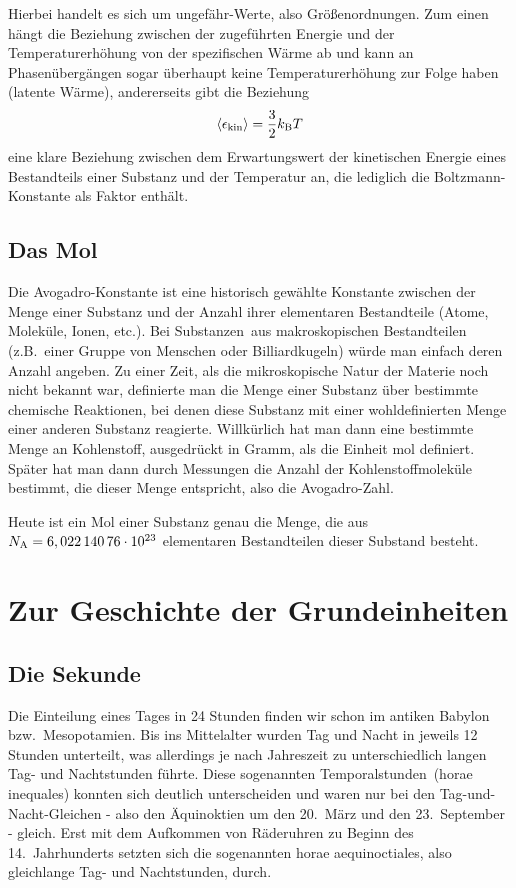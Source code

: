 Hierbei handelt es sich um \glqq ungef\"ahr\grqq-Werte, also Gr\"o\ss enordnungen. Zum einen h\"angt
die Beziehung zwischen der zugef\"uhrten Energie und der Temperaturerh\"ohung von der spezifischen
W\"arme ab und kann an Phasen\"uberg\"angen sogar \"uberhaupt keine Temperaturerh\"ohung zur
Folge haben (latente W\"arme), andererseits gibt die Beziehung
\begin{equation}
                   \langle \epsilon_{\rm kin} \rangle = \frac{3}{2} k_{\rm B} T 
\end{equation}
eine klare Beziehung zwischen dem Erwartungswert der kinetischen Energie eines Bestandteils einer Substanz
und der Temperatur an, die lediglich die Boltzmann-Konstante als Faktor enth\"alt. 

\subsection{Das Mol}

Die Avogadro-Konstante ist eine historisch gew\"ahlte Konstante 
zwischen der Menge
einer Substanz und der Anzahl ihrer elementaren Bestandteile (Atome, Molek\"ule, Ionen, etc.). Bei
\glqq Substanzen\grqq\ aus makroskopischen Bestandteilen (z.B.\ einer Gruppe von Menschen
oder Billiardkugeln) w\"urde man einfach deren Anzahl angeben. Zu einer Zeit, als die mikroskopische
Natur der Materie noch nicht bekannt war, definierte man die Menge einer Substanz \"uber
bestimmte chemische Reaktionen, bei denen diese Substanz mit einer wohldefinierten Menge
einer anderen Substanz reagierte. Willk\"urlich hat man dann eine bestimmte Menge an Kohlenstoff, 
ausgedr\"uckt in Gramm, als die Einheit mol definiert. Sp\"ater hat man dann durch Messungen die Anzahl
der Kohlenstoffmolek\"ule bestimmt, die dieser Menge entspricht, also die Avogadro-Zahl.

Heute ist ein Mol einer Substanz genau die Menge, die aus $N_{\rm A}= 6,022\,140\,76 \cdot 10^{23}$ 
elementaren Bestandteilen dieser Substand besteht. 

\section{Zur Geschichte der Grundeinheiten}

\subsection{Die Sekunde}

Die Einteilung eines Tages in 24 Stunden finden wir schon im antiken Babylon bzw.\ Mesopotamien. 
Bis ins Mittelalter wurden Tag und Nacht in jeweils 12 Stunden unterteilt, 
was allerdings je nach Jahreszeit zu unterschiedlich
langen Tag- und Nachtstunden f\"uhrte. Diese sogenannten 
\glqq Temporalstunden\grqq\ (horae inequales) konnten
sich deutlich unterscheiden und waren nur bei den Tag-und-Nacht-Gleichen - also den \"Aquinoktien um den
20.\ M\"arz und den 23.\ September - gleich. Erst mit dem Aufkommen
von R\"aderuhren zu Beginn des 14.\ Jahrhunderts setzten sich die sogenannten horae aequinoctiales, also
gleichlange Tag- und Nachtstunden, durch.   


